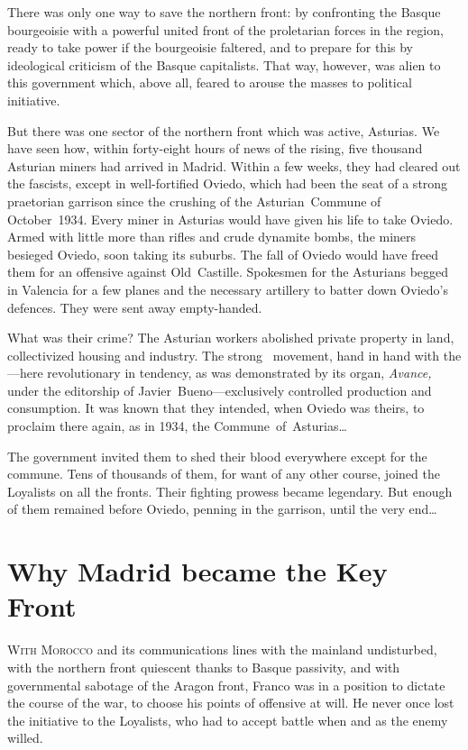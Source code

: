 There was only one way to save the northern front: by confronting the Basque bourgeoisie with a powerful united front of the proletarian forces in the region, ready to take power if the bourgeoisie faltered, and to prepare for this by ideological criticism of the Basque capitalists. That way, however, was alien to this government which, above all, feared to arouse the masses to political initiative.

\indexCNT\indexUGT{}
But there was one sector of the northern front which was active, Asturias. We have seen how, within forty-eight hours of news of the rising, five thousand Asturian miners had arrived in Madrid. Within a few weeks, they had cleared out the fascists, except in well-fortified Oviedo, which had been the seat of a strong praetorian garrison since the crushing of the Asturian~Commune of October~1934. Every miner in Asturias would have given his life to take Oviedo. Armed with little more than rifles and crude dynamite bombs, the miners besieged Oviedo, soon taking its suburbs. The fall of Oviedo would have freed them for an offensive against Old~Castille. Spokesmen for the Asturians begged in Valencia for a few planes and the necessary artillery to batter down Oviedo’s defences. They were sent away empty-handed.

What was their crime? The Asturian workers abolished private property in land, collectivized housing and industry. The strong \CNT\ movement, hand in hand with the \UGT---here revolutionary in tendency, as was demonstrated by its organ, \emph{Avance,} under the editorship of Javier~Bueno---exclusively controlled production and consumption. It was known that they intended, when Oviedo was theirs, to proclaim there again, as in 1934, the Commune~of~Asturias\dots

The government invited them to shed their blood everywhere except for the commune. Tens of thousands of them, for want of any other course, joined the Loyalists on all the fronts. Their fighting prowess became legendary. But enough of them remained before Oviedo, penning in the garrison, until the very end\dots

\section{Why Madrid became the Key Front}

\textsc{With Morocco} and its communications lines with the mainland undisturbed, with the northern front quiescent thanks to Basque passivity, and with governmental sabotage of the Aragon front, Fran\-co was in a position to dictate the course of the war, to choose his points of offensive at will. He never once lost the initiative to the Loyalists, who had to accept battle when and as the enemy willed.


